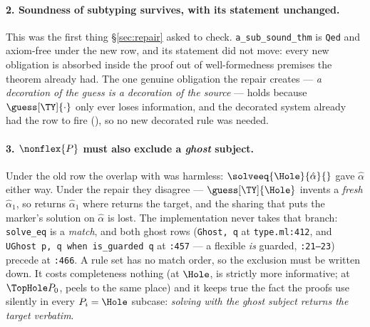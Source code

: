 \documentclass[11pt,a4paper]{article}
\theoremstyle{definition}
\newcommand{\coq}[1]{\texttt{\small #1}}
\newcommand{\Qed}{\coq{Qed}}
\begin{document}
\paragraph{2. Soundness of subtyping survives, with its statement
unchanged.}  This was the first thing \S\ref{sec:repair} asked to check.
\coq{a\_sub\_sound\_thm} is \Qed{} and axiom-free under the new row, and its
statement did not move: every new obligation is absorbed inside the proof
out of well-formedness premises the theorem already had.  The one genuine
obligation the repair creates --- \emph{a decoration of the guess is a
decoration of the source} --- holds because $\guess[\TY]{\cdot}$ only ever
loses information, and the decorated system already had the row to fire
(), so no new decorated rule was needed.

\paragraph{3. $\nonflex{P}$ must also exclude a \emph{ghost} subject.}
Under the old row the overlap with  was harmless:
$\solveeq{\Hole}{\hat\alpha}{}$ gave $\hat\alpha$ either way.  Under the
repair they disagree --- $\guess[\TY]{\Hole}$ invents a \emph{fresh}
$\hat\alpha_1$, so  returns $\hat\alpha_1$ where
 returns the target, and the sharing that puts the
marker's solution on $\hat\alpha$ is lost.  The implementation never takes
that branch: \texttt{solve\_eq} is a \emph{match}, and both ghost rows
(\texttt{Ghost,\,q} at \texttt{type.ml:412}, and \texttt{UGhost\,p,\,q when
is\_guarded\,q} at \texttt{:457} --- a flexible \emph{is} guarded,
\texttt{:21--23}) precede  at \texttt{:466}.  A rule set has
no match order, so the exclusion must be written down.  It costs
completeness nothing (at $\Hole$,  is strictly more
informative; at $\TopHole P_0$,  peels to the same
place) and it keeps true the fact the proofs use silently in every
$P_i = \Hole$ subcase: \emph{solving with the ghost subject returns the
target verbatim}.
\end{document}
